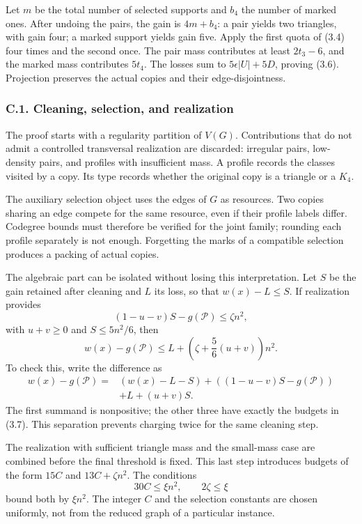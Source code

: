 \documentclass[english,11pt,a4paper]{article}
\begin{document}
Let \(m\) be the total number of selected supports and \(b_4\) the number of marked ones. After undoing the pairs, the gain is \(4m+b_4\): a pair yields two triangles, with gain four; a marked support yields gain five. Apply the first quota of (3.4) four times and the second once. The pair mass contributes at least \(2t_3-6\), and the marked mass contributes \(5t_4\). The losses sum to \(5\epsilon|U|+5D\), proving (3.6). Projection preserves the actual copies and their edge-disjointness.

\subsubsection{C.1. Cleaning, selection, and realization}\label{c.1.-cleaning-selection-and-realization}

The proof starts with a regularity partition of \(V(G)\). Contributions that do not admit a controlled transversal realization are discarded: irregular pairs, low-density pairs, and profiles with insufficient mass. A profile records the classes visited by a copy. Its type records whether the original copy is a triangle or a \(K_4\).

The auxiliary selection object uses the edges of \(G\) as resources. Two copies sharing an edge compete for the same resource, even if their profile labels differ. Codegree bounds must therefore be verified for the joint family; rounding each profile separately is not enough. Forgetting the marks of a compatible selection produces a packing of actual copies.

The algebraic part can be isolated without losing this interpretation. Let \(S\) be the gain retained after cleaning and \(L\) its loss, so that \(w(x)-L\le S\). If realization provides \[
(1-u-v)S-g(\mathcal P)\le\zeta n^2,
\] with \(u+v\ge0\) and \(S\le5n^2/6\), then \[
w(x)-g(\mathcal P)
\le L+\left(\zeta+\frac56(u+v)\right)n^2.
\tag{3.7}
\] To check this, write the difference as \[
\begin{aligned}
w(x)-g(\mathcal P)
={}&(w(x)-L-S)+((1-u-v)S-g(\mathcal P))\\
&+L+(u+v)S.
\end{aligned}
\] The first summand is nonpositive; the other three have exactly the budgets in (3.7). This separation prevents charging twice for the same cleaning step.

The realization with sufficient triangle mass and the small-mass case are combined before the final threshold is fixed. This last step introduces budgets of the form \(15C\) and \(13C+\zeta n^2\). The conditions \[
30C\le\xi n^2,\qquad 2\zeta\le\xi
\] bound both by \(\xi n^2\). The integer \(C\) and the selection constants are chosen uniformly, not from the reduced graph of a particular instance.
\end{document}
